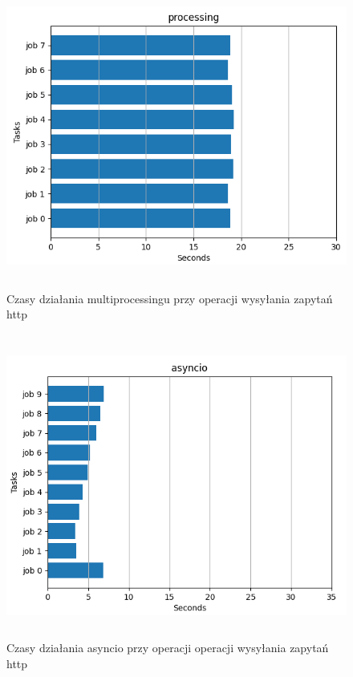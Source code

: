 \begin{figure}[H]
    \includegraphics[height=100mm]{zdjecia/processing_requests}
    \caption{Czasy działania multiprocessingu przy operacji wysyłania zapytań http}
\end{figure}

\begin{figure}[H]
    \includegraphics[height=100mm]{zdjecia/asyncio_requests}
    \caption{Czasy działania asyncio przy operacji operacji wysyłania zapytań http}
\end{figure}

